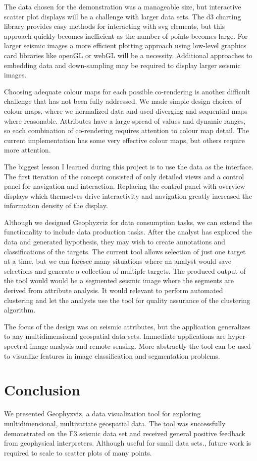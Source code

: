 \documentclass[journal]{vgtc}                %
\begin{document}
The data chosen for the demonstration was a manageable size, but interactive scatter plot
displays will be a challenge with larger data sets. The d3 charting library provides easy methods for
interacting with svg elements, but this approach quickly becomes inefficient as the number of
points becomes large. For larger seismic images a more efficient plotting approach using low-level
graphics card libraries like openGL or webGL will be a necessity. Additional approaches to embedding
data and down-sampling may be required to display larger seismic images.

Choosing adequate colour maps for each possible co-rendering is another difficult challenge
that has not been fully addressed. We made simple design choices of colour maps, where we normalized
data and used diverging and sequential maps where reasonable. Attributes have a large spread of
values and dynamic ranges, so each combination of co-rendering requires attention to colour map detail.
The current implementation has some very effective colour maps, but others require more attention.

The biggest lesson I learned during this project is to use the data as the interface. The first iteration
of the concept consisted of only detailed views and a control panel for navigation and interaction.
Replacing the control panel with overview displays which themselves drive interactivity and navigation
greatly increased the information density of the display.

Although we designed Geophyzviz for data consumption tasks, we can extend the functionality
to include data production tasks. After the analyst has explored the data and generated hypothesis,
they may wish to create annotations and classifications of the targets. The current tool allows
selection of just one target at a time, but we can foresee many situations where an analyst would
save selections and generate a collection of multiple targets. The produced output of the tool would
would be a segmented seismic image where the segments are derived from attribute analysis. It would
relevant to perform automated clustering and let the analysts use the tool for quality assurance of
the clustering algorithm.

The focus of the design was on seismic attributes, but the application generalizes to any multidimensional
geospatial data sets. Immediate applications are hyper-spectral image analysis and remote sensing. More abstractly
the tool can be used to visualize features in image classification and segmentation problems.


\section{Conclusion}
We presented Geophyzviz, a data visualization tool for exploring multidimensional, multivariate
geospatial data. The tool was successfully demonstrated on the F3 seismic data set and received
general positive feedback from geophysical interpreters. Although useful for small data sets., future work is required to scale to scatter plots of many points. 




\end{document}
